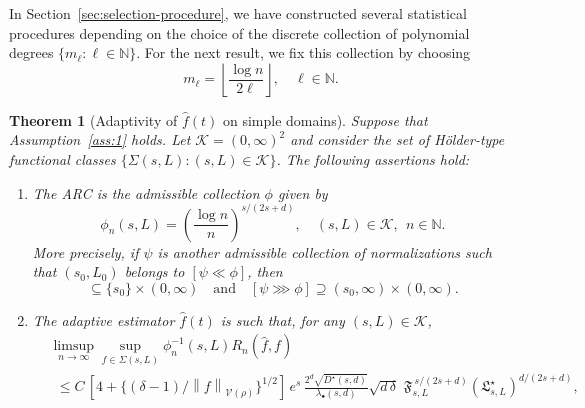 \documentclass[bj,authoryear]{imsart}
\numberwithin{equation}{section}
\theoremstyle{plain}
\newtheorem{theorem}{Theorem}[section]
\theoremstyle{remark}
\newcommand{\N}{\mathbb{N}}
\newcommand{\1}{\mathds{1}}
\newcommand{\voisin}{\mathcal{V}}
\newcommand{\pwrisk}{R_n}
\newcommand{\finfty}{\left\|f\right\|_{\voisin(\rho)}}
\begin{document}
    In Section~\ref{sec:selection-procedure}, we have constructed several statistical procedures depending on the choice of the discrete collection of polynomial degrees $\{m_{\ell} : \ell\in \N\}$. For the next result, we fix this collection by choosing
    \begin{equation}\label{eq:m.l}
        m_{\ell} = \left\lfloor\frac{\log n}{2\ell}\right\rfloor, \quad \ell\in \N.
    \end{equation}

    \begin{theorem}[Adaptivity of $\hat{f}(t)$ on simple domains]\label{thm:adaptivity.simple.domains}
        Suppose that Assumption~\ref{ass:1} holds.
        Let $\mathcal{K} = (0,\infty)^2$ and consider the set of H\"older-type functional classes $\{\Sigma(s,L) : (s,L)\in \mathcal{K}\}$.
        The following assertions hold:
        \begin{enumerate}
            \item The ARC is the admissible collection $\phi$ given by
                \begin{equation}\label{eq:ARC.simple.geometry}
                    \phi_n(s,L) = \left(\frac{\log n}{n}\right)^{s/(2s+d)},
                    \quad (s,L)\in \mathcal{K}, ~~n\in \N.
                \end{equation}
                More precisely, if $\psi$ is another admissible collection of normalizations such that $(s_0,L_0)$ belongs to $[\psi\ll \phi]$, then
                \begin{equation*}
                    [\psi\ll \phi]\subseteq \{s_0\} \times (0,\infty)
                    \quad \text{and} \quad
                    [\psi\ggg \phi]\supseteq  (s_0,\infty) \times (0,\infty).
                \end{equation*}
            \item The adaptive estimator $\hat{f}(t)$ is such that, for any $(s,L)\in \mathcal{K}$,
                \begin{equation*}
                    \begin{aligned}
                        &\limsup_{n\to\infty} \sup_{f\in \Sigma(s,L)} \phi_n^{-1}(s,L) \pwrisk(\hat{f}, f) \\[-2mm]
                        &~~\leq C \, \left[4 + \big\{(\delta-1) / \finfty\big\}^{1/2}\right] \, e^s \, \frac{2^d \sqrt{D^{\star}(s,d)}}{\lambda_{\bullet}(s,d)} \sqrt{d \, \delta} \, \, \mathfrak{F}_{s,L}^{~s/(2s+d)} (\mathfrak{L}_{s,L}^{\star})^{d/(2s+d)},
                    \end{aligned}

\end{equation*}
\end{enumerate}
\end{theorem}
\end{document}
